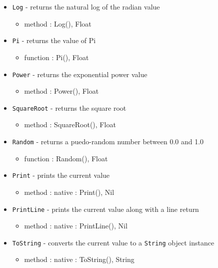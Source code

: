 \documentclass[12pt]{article}
\begin{document}
\begin{itemize}
\begin{itemize}
	\end{itemize}	
    \item \texttt{Log} - returns the natural log of the radian value
    	\begin{itemize}
	\item method : Log(), Float
	\end{itemize}
    \item \texttt{Pi} - returns the value of Pi
    	\begin{itemize}
	\item function : Pi(), Float
	\end{itemize}
    \item \texttt{Power} - returns the exponential power value
    	\begin{itemize}
	\item method : Power(), Float
	\end{itemize}
    \item \texttt{SquareRoot} - returns the square root
    	\begin{itemize}
	\item method : SquareRoot(), Float
	\end{itemize}
    \item \texttt{Random} - returns a puedo-random number between 0.0 and 1.0 
    	\begin{itemize}
	\item function : Random(), Float
	\end{itemize}
    \item \texttt{Print} - prints the current value
    	\begin{itemize}
	\item method : native : Print(), Nil
	\end{itemize}
    \item \texttt{PrintLine} - prints the current value along with a line return
    	\begin{itemize}
	\item method : native : PrintLine(), Nil
	\end{itemize}
    \item \texttt{ToString} - converts the current value to a \texttt{String} object instance
   	\begin{itemize}
	\item method : native : ToString(), String
	\end{itemize}
\end{itemize}
\end{document}
